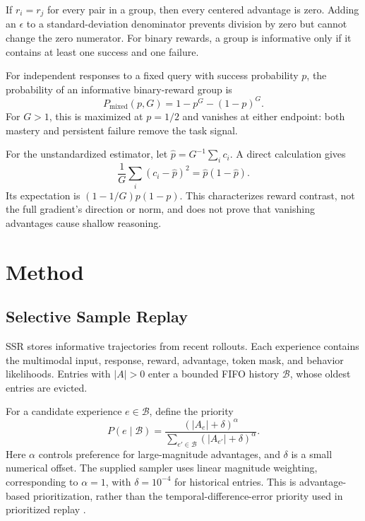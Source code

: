 \documentclass[twocolumn]{article}
\begin{document}
If $r_i=r_j$ for every pair in a group, then every centered advantage is zero. Adding an $\epsilon$ to a standard-deviation denominator prevents division by zero but cannot change the zero numerator. For binary rewards, a group is informative only if it contains at least one success and one failure.

For independent responses to a fixed query with success probability $p$, the probability of an informative binary-reward group is
\begin{equation}
 P_{\mathrm{mixed}}(p,G)=1-p^G-(1-p)^G.
 \label{eq:mixed}
\end{equation}
For $G>1$, this is maximized at $p=1/2$ and vanishes at either endpoint: both mastery and persistent failure remove the task signal.

For the unstandardized estimator, let $\widehat p=G^{-1}\sum_i c_i$. A direct calculation gives
\begin{equation}
 \frac{1}{G}\sum_i(c_i-\widehat p)^2
 =\widehat p(1-\widehat p).
 \label{eq:variance}
\end{equation}
Its expectation is $(1-1/G)p(1-p)$. This characterizes reward contrast, not the full gradient's direction or norm, and does not prove that vanishing advantages cause shallow reasoning.

\section{Method}
\label{sec:method}

\subsection{Selective Sample Replay}
\label{sec:ssr}

SSR stores informative trajectories from recent rollouts. Each experience contains the multimodal input, response, reward, advantage, token mask, and behavior likelihoods. Entries with $|A|>0$ enter a bounded FIFO history $\mathcal B$, whose oldest entries are evicted.

For a candidate experience $e\in\mathcal B$, define the priority
\begin{equation}
 P(e\mid\mathcal B)=
 \frac{(|A_e|+\delta)^\alpha}
 {\sum_{e'\in\mathcal B}(|A_{e'}|+\delta)^\alpha}.
 \label{eq:priority}
\end{equation}
Here $\alpha$ controls preference for large-magnitude advantages, and $\delta$ is a small numerical offset. The supplied sampler uses linear magnitude weighting, corresponding to $\alpha=1$, with $\delta=10^{-4}$ for historical entries. This is advantage-based prioritization, rather than the temporal-difference-error priority used in prioritized replay \citep{per}.
\end{document}
